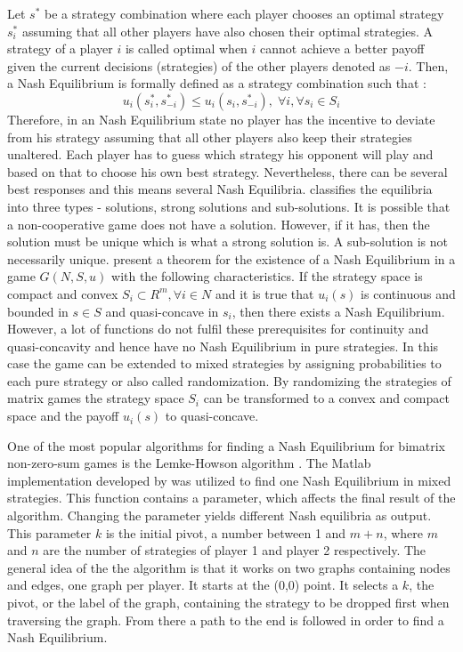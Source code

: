 Let $s^*$ be a strategy combination where each player chooses an optimal strategy $s_i^*$ assuming that all other players have also chosen their optimal strategies. A strategy of a player $i$ is called optimal when $i$ cannot achieve a better payoff given the current decisions (strategies) of the other players denoted as $-i$. Then, a Nash Equilibrium is formally defined as a strategy combination such that \citep{holler2006einfuhrung}:
\begin{equation}
u_i(s_i^*, s_{-i}^*) \leq u_i(s_i,s_{-i}^*), \; \forall i, \forall s_i \in S_i
\end{equation}
Therefore, in an Nash Equilibrium state no player has the incentive to deviate from his strategy assuming that all other players also keep their strategies unaltered. Each player has to guess which strategy his opponent will play and based on that to choose his own best strategy. Nevertheless, there can be several best responses and this means several Nash Equilibria. \citet{nash1950equilibrium} classifies the equilibria into three types - solutions, strong solutions and sub-solutions. It is possible that a non-cooperative game does not have a solution. However, if it has, then the solution must be unique which is what a strong solution is. A sub-solution is not necessarily unique. \citet{holler2006einfuhrung} present a theorem for the existence of a Nash Equilibrium in a game $G(N,S,u)$ with the following characteristics. If the strategy space is compact and convex $S_i \subset R^m, \forall i \in N$ and it is true that $u_i(s)$ is continuous and bounded in $s \in S$ and quasi-concave in $s_i$, then there exists a Nash Equilibrium. However, a lot of functions do not fulfil these prerequisites for continuity and quasi-concavity and hence have no Nash Equilibrium in pure strategies. In this case the game can be extended to mixed strategies by assigning probabilities to each pure strategy or also called randomization. By randomizing the strategies of matrix games the strategy space $S_i$ can be transformed to a convex and compact space and the payoff $u_i(s)$ to quasi-concave.  

One of the most popular algorithms for finding a Nash Equilibrium for bimatrix non-zero-sum games is the Lemke-Howson algorithm \citep{lemke1964equilibrium}. The Matlab implementation developed by \citet{lemkeHowson2014Matlab} was utilized to find one Nash Equilibrium in mixed strategies. This function contains a parameter, which affects the final result of the algorithm. Changing the parameter yields different Nash equilibria as output. This parameter $k$ is the initial pivot, a number between 1 and $m+n$, where $m$ and $n$ are the number of strategies of player 1 and player 2 respectively. The general idea of the the algorithm is that it works on two graphs containing nodes and edges, one graph per player. It starts at the (0,0) point. It selects a $k$, the pivot, or the label of the graph, containing the strategy to be dropped first when traversing the graph. From there a path to the end is followed in order to find a Nash Equilibrium. 

